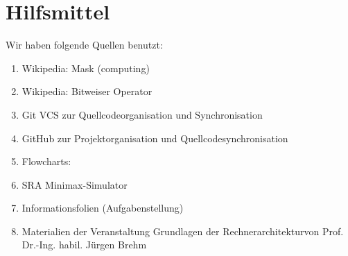 \documentclass[12pt,titlepage]{article}
\begin{document}
\newpage



\section{Hilfsmittel}
Wir haben folgende Quellen benutzt:
\begin{enumerate} 
\item Wikipedia: \dq Mask (computing)\dq \\ 
\item Wikipedia: \dq Bitweiser Operator\dq \\ 
\item Git VCS zur Quellcodeorganisation und Synchronisation
\item GitHub zur Projektorganisation und Quellcodesynchronisation
\item Flowcharts: 
\item SRA Minimax-Simulator
\item Informationsfolien (Aufgabenstellung)
\item Materialien der Veranstaltung \dq Grundlagen der Rechnerarchitektur\dq von Prof. Dr.-Ing. habil. J{\"u}rgen Brehm
\end{enumerate}
\end{document}

